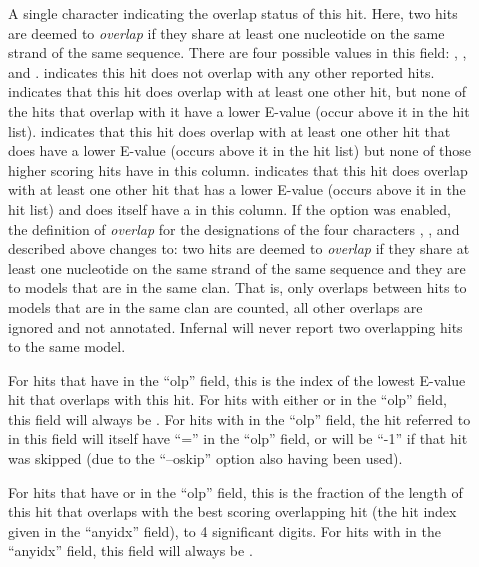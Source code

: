 \begin{description}

\item[] A single character indicating the overlap status
  of this hit. Here, two hits are deemed to \emph{overlap} if they
  share at least one nucleotide on the same strand of the same
  sequence. There are four possible values in this field: \ccode{*},
  \ccode{\^}, \ccode{\$} and \ccode{=}.  \ccode{*} indicates this hit
  does not overlap with any other reported hits. \ccode{\^} indicates
  that this hit does overlap with at least one other hit, but none of
  the hits that overlap with it have a lower E-value (occur above it in
  the hit list). \ccode{\$} indicates that this hit does overlap with
  at least one other hit that does have a lower E-value (occurs above
  it in the hit list) but none of those higher scoring hits have
  \ccode{\^} in this column. \ccode{=} indicates that this hit does
  overlap with at least one other hit that has a lower E-value (occurs
  above it in the hit list) and does itself have a \ccode{\^} in this
  column. If the  option was enabled, the definition of
  \emph{overlap} for the designations of the four characters
  \ccode{*}, \ccode{\^}, \ccode{\$} and \ccode{=} described above
  changes to: two hits are deemed to \emph{overlap} if they share at
  least one nucleotide on the same strand of the same sequence and
  they are to models that are in the same clan. That is, only overlaps
  between hits to models that are in the same clan are counted, all
  other overlaps are ignored and not annotated.  Infernal will never
  report two overlapping hits to the same model.

\item[]
For hits that have \ccode{=} in the ``olp'' field, this is the
index of the lowest E-value hit that overlaps with this hit.
For hits with either \ccode{*} or \ccode{\^} in the ``olp'' field,
this field will always be \ccode{-}. For hits with \ccode{\$} in the 
``olp'' field, the hit referred to in this field will itself have
``='' in the ``olp'' field, or will be ``-1'' if that hit was skipped
(due to the ``--oskip'' option also having been used).

\item[]
For hits that have \ccode{=} or \ccode{\$} in the ``olp'' field, this is the
fraction of the length of this hit that overlaps with the best scoring
overlapping hit (the hit index given in the ``anyidx'' field), to
4 significant digits. 
For hits with \ccode{-} in the ``anyidx''
field, this field will always be \ccode{-}.  


\end{description}
